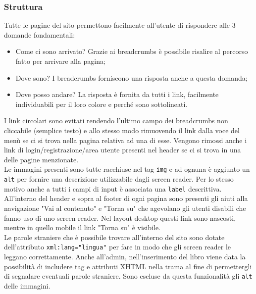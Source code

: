 \documentclass[12pt,a4paper,headings=optiontohead]{article}
\begin{document}
	\subsubsection{Struttura}
	Tutte le pagine del sito permettono facilmente all'utente di rispondere alle 3 domande fondamentali:
	\begin{itemize}
		\item Come ci sono arrivato? Grazie ai breadcrumbs è possibile risalire al percorso fatto per arrivare alla pagina;
		\item Dove sono? I breadcrumbs forniscono una risposta anche a questa domanda;
		\item Dove posso andare? La risposta è fornita da tutti i link, facilmente individuabili per il loro colore e perché sono sottolineati.
	\end{itemize} 
	I link circolari sono evitati rendendo l'ultimo campo dei breadcrumbs non cliccabile (semplice testo) e allo stesso modo rimuovendo il link dalla voce del menù se ci si trova nella pagina relativa ad una di esse. Vengono rimossi anche i link di login/registrazione/area utente presenti nel header se ci si trova in una delle pagine menzionate.  \\
	Le immagini presenti sono tutte racchiuse nel tag \texttt{img} e ad ognuna è aggiunto un \texttt{alt} per fornire una descrizione utilizzabile dagli screen reader. Per lo stesso motivo anche a tutti i campi di input è associata una \texttt{label} descrittiva. \\
	All'interno del header e sopra al footer di ogni pagina sono presenti gli aiuti alla navigazione "Vai al contenuto" e "Torna su" che agevolano gli utenti disabili che fanno uso di uno screen reader. Nel layout desktop questi link sono nascosti, mentre in quello mobile il link "Torna su" è visibile.\\
	Le parole straniere che è possibile trovare all'interno del sito sono dotate dell'attributo \texttt{xml:lang="lingua"} per fare in modo che gli screen reader le leggano correttamente. Anche all'admin, nell'inserimento del libro viene data la possibilità di includere tag e attributi XHTML nella trama al fine di permettergli di segnalare eventuali parole straniere. Sono escluse da questa funzionalità gli \texttt{alt} delle immagini.
\end{document}

